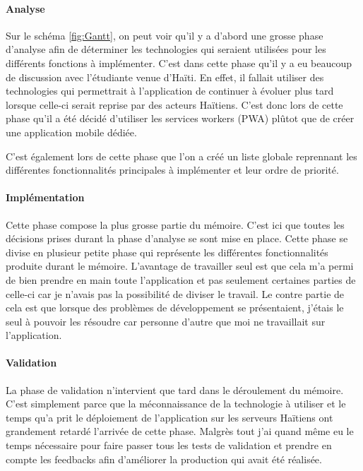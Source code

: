 \documentclass{EPL-master-thesis-covers-FR}
\begin{document}
			\paragraph*{Analyse}
			Sur le schéma \ref{fig:Gantt}, on peut voir qu'il y a d'abord une grosse phase d'analyse afin de déterminer les technologies qui seraient utilisées pour les différents fonctions à implémenter. C'est dans cette phase qu'il y a eu beaucoup de discussion avec l'étudiante venue d'Haïti. En effet, il fallait utiliser des technologies qui permettrait à l'application de continuer à évoluer plus tard lorsque celle-ci serait reprise par des acteurs Haïtiens.
				C'est donc lors de cette phase qu'il a été décidé d'utiliser les services workers (PWA) plûtot que de créer une application mobile dédiée.
			
			C'est également lors de cette phase que l'on a créé un liste globale reprennant les différentes fonctionnalités principales à implémenter et leur ordre de priorité.
			
			\paragraph*{Implémentation} 
			Cette phase compose la plus grosse partie du mémoire. C'est ici que toutes les décisions prises durant la phase d'analyse se sont mise en place. Cette phase se divise en plusieur petite phase qui représente les différentes fonctionnalités produite durant le mémoire. L'avantage de travailler seul est que cela m'a permi de bien prendre en main toute l'application et pas seulement certaines parties de celle-ci car je n'avais pas la possibilité de diviser le travail. 
			Le contre partie de cela est que lorsque des problèmes de développement se présentaient, j'étais le seul à pouvoir les résoudre car personne d'autre que moi ne travaillait sur l'application. 
			
			\paragraph*{Validation}
			La phase de validation n'intervient que tard dans le déroulement du mémoire. C'est simplement parce que la méconnaissance de la technologie à utiliser et le temps qu'a prit le déploiement de l'application sur les serveurs Haïtiens ont grandement retardé l'arrivée de cette phase. Malgrès tout j'ai quand même eu le temps nécessaire pour faire passer tous les tests de validation et prendre en compte les feedbacks afin d'améliorer la production qui avait été réalisée.			
			
\end{document}
